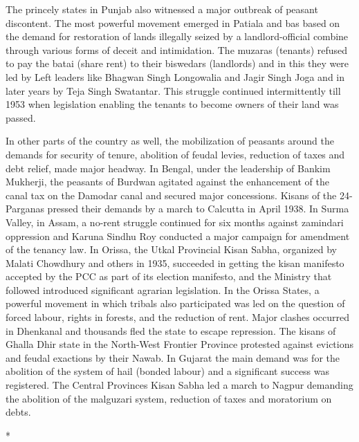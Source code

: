 \begin{multicols}{2}
The princely states in Punjab also witnessed a major outbreak of peasant discontent. The most powerful movement emerged in Patiala and bas based on the demand for restoration of lands illegally seized by a landlord-official combine through various forms of deceit and intimidation. The muzaras (tenants) refused to pay the batai (share rent) to their biswedars (landlords) and in this they were led by Left leaders like Bhagwan Singh Longowalia and Jagir Singh Joga and in later years by Teja Singh Swatantar. This struggle continued intermittently till 1953 when legislation enabling the tenants to become owners of their land was passed.

In other parts of the country as well, the mobilization of peasants around the demands for security of tenure, abolition of feudal levies, reduction of taxes and debt relief, made major headway. In Bengal, under the leadership of Bankim Mukherji, the peasants of Burdwan agitated against the enhancement of the canal tax on the Damodar canal and secured major concessions. Kisans of the 24-Parganas pressed their demands by a march to Calcutta in April 1938. In Surma Valley, in Assam, a no-rent struggle continued for six months against zamindari oppression and Karuna Sindhu Roy conducted a major campaign for amendment of the tenancy law. In Orissa, the Utkal Provincial Kisan Sabha, organized by Malati Chowdhury and others in 1935, succeeded in getting the kisan manifesto accepted by the PCC as part of its election manifesto, and the Ministry that followed introduced significant agrarian legislation. In the Orissa States, a powerful movement in which tribals also participated was led on the question of forced labour, rights in forests, and the reduction of rent. Major clashes occurred in Dhenkanal and thousands fled the state to escape repression. The kisans of Ghalla Dhir state in the North-West Frontier Province protested against evictions and feudal exactions by their Nawab. In Gujarat the main demand was for the abolition of the system of hail (bonded labour) and a significant success was registered. The Central Provinces Kisan Sabha led a march to Nagpur demanding the abolition of the malguzari system, reduction of taxes and moratorium on debts.

\begin{center}*\end{center}

\paragraph*{}


\end{multicols}
